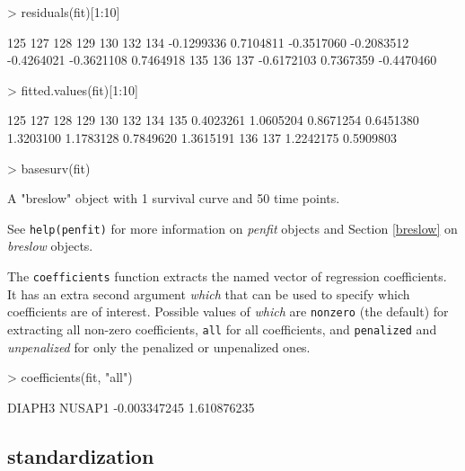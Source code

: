 \documentclass[a4paper]{article}
\newcommand{\Robject}[1]{{\texttt{#1}}}
\newcommand{\Rfunction}[1]{{\texttt{#1}}}
\newcommand{\Rclass}[1]{{\textit{#1}}}
\newcommand{\Rfunarg}[1]{{\textit{#1}}}
\begin{document}
\begin{Schunk}
\begin{Sinput}
> residuals(fit)[1:10]
\end{Sinput}
\begin{Soutput}
       125        127        128        129        130        132        134 
-0.1299336  0.7104811 -0.3517060 -0.2083512 -0.4264021 -0.3621108  0.7464918 
       135        136        137 
-0.6172103  0.7367359 -0.4470460 
\end{Soutput}
\begin{Sinput}
> fitted.values(fit)[1:10]
\end{Sinput}
\begin{Soutput}
      125       127       128       129       130       132       134       135 
0.4023261 1.0605204 0.8671254 0.6451380 1.3203100 1.1783128 0.7849620 1.3615191 
      136       137 
1.2242175 0.5909803 
\end{Soutput}
\begin{Sinput}
> basesurv(fit)
\end{Sinput}
\begin{Soutput}
A "breslow" object with 1 survival curve and 50 time points.
\end{Soutput}
\end{Schunk}

See \Robject{help(penfit)} for more information on \Rclass{penfit} objects and Section \ref{breslow} on \Rclass{breslow} objects.

The \Rfunction{coefficients} function extracts the named vector of regression coefficients. It has an extra second argument \Rfunarg{which} that can be used to specify which coefficients are of interest. Possible values of \Rfunarg{which} are \Robject{nonzero} (the default) for extracting all non-zero coefficients, \Robject{all} for all coefficients, and \Robject{penalized} and \Rfunarg{unpenalized} for only the penalized or unpenalized ones.

\begin{Schunk}
\begin{Sinput}
> coefficients(fit, "all")
\end{Sinput}
\begin{Soutput}
      DIAPH3       NUSAP1 
-0.003347245  1.610876235 
\end{Soutput}
\end{Schunk}

\subsection{standardization}
\end{document}
